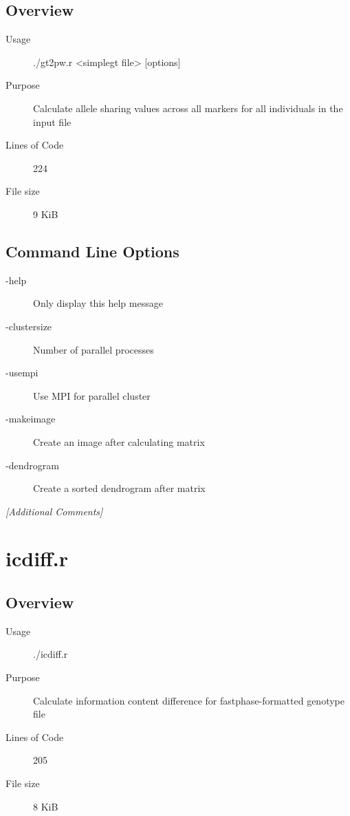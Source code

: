 \subsection{Overview}
\label{sec:gt2pw.r-overview}

\begin{description}
\item[Usage] ./gt2pw.r <simplegt file> [options]
\item[Purpose] Calculate allele sharing values across all markers for all individuals in the input file
\item[Lines of Code] 224
\item[File size] 9 KiB
\end{description}

\subsection{Command Line Options}
\label{sec:gt2pw.r-command-line}

\begin{description}
\item[-help] Only display this help message
\item[-clustersize] Number of parallel processes
\item[-usempi] Use MPI for parallel cluster
\item[-makeimage] Create an image after calculating matrix
\item[-dendrogram] Create a sorted dendrogram after matrix
\end{description}

\emph{[Additional Comments]}

\section{icdiff.r}
\label{sec:icdiff.r}

\subsection{Overview}
\label{sec:icdiff.r-overview}

\begin{description}
\item[Usage] ./icdiff.r
\item[Purpose] Calculate information content difference for fastphase-formatted genotype file
\item[Lines of Code] 205
\item[File size] 8 KiB
\end{description}

